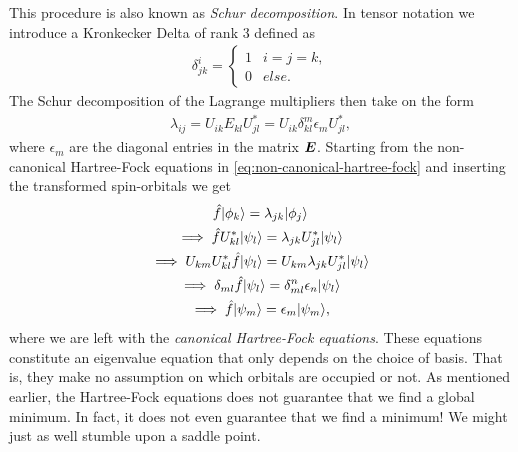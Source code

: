         This procedure is also known as \emph{Schur decomposition}.
        In tensor notation we introduce a Kronkecker Delta of rank 3 defined as
        \begin{align}
            \delta^{i}_{jk} = \begin{cases}
                1 & i = j = k, \\
                0 & else.
            \end{cases}
        \end{align}
        The Schur decomposition of the Lagrange multipliers then take on the
        form
        \begin{align}
            \lambda_{ij} = U_{ik} E_{kl} U^{*}_{jl}
            = U_{ik} \delta^{m}_{kl} \epsilon_{m} U^{*}_{jl},
        \end{align}
        where $\epsilon_m$ are the diagonal entries in the matrix $\boldsymbol{E}$.
        Starting from the non-canonical Hartree-Fock equations in
        \autoref{eq:non-canonical-hartree-fock} and inserting the transformed
        spin-orbitals we get
        \begin{gather}
            \hat{f}| \phi_k \rangle = \lambda_{jk}| \phi_j \rangle
            \\
            \implies
            \hat{f} U^{*}_{kl}| \psi_{l} \rangle = \lambda_{jk} U^{*}_{jl} | \psi_l \rangle
            \\
            \implies
            U_{km} U^{*}_{kl} \hat{f}| \psi_l \rangle
            = U_{km} \lambda_{jk} U^{*}_{jl} | \psi_l \rangle
            \\
            \implies
            \delta_{ml} \hat{f} | \psi_l \rangle
            = \delta^{n}_{ml} \epsilon_{n} | \psi_l \rangle
            \\
            \implies
            \hat{f}| \psi_m \rangle
            = \epsilon_{m} | \psi_m \rangle,
            \label{eq:canonical-hartree-fock}
        \end{gather}
        where we are left with the \emph{canonical Hartree-Fock equations}.
        These equations constitute an eigenvalue equation that only depends on
        the choice of basis.
        That is, they make no assumption on which orbitals are occupied or not.
        As mentioned earlier, the Hartree-Fock equations does not guarantee that
        we find a global minimum.
        In fact, it does not even guarantee that we find a minimum!
        We might just as well stumble upon a saddle point.

